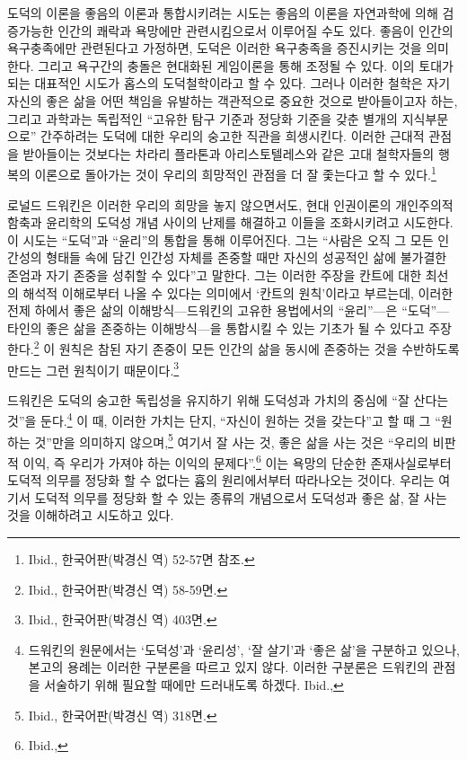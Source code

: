 도덕의 이론을 좋음의 이론과 통합시키려는 시도는 좋음의 이론을 자연과학에 의해 검증가능한 인간의 쾌락과 욕망에만 관련시킴으로서 이루어질 수도 있다. 좋음이 인간의 욕구충족에만 관련된다고 가정하면, 도덕은 이러한 욕구충족을 증진시키는 것을 의미한다. 그리고 욕구간의 충돌은 현대화된 게임이론을 통해 조정될 수 있다. 이의 토대가 되는 대표적인 시도가 홉스의 도덕철학이라고 할 수 있다. 그러나 이러한 철학은 자기 자신의 좋은 삶을 어떤 책임을 유발하는 객관적으로 중요한 것으로 받아들이고자 하는, 그리고 과학과는 독립적인 ``고유한 탐구 기준과 정당화 기준을 갖춘 별개의 지식부문으로'' 간주하려는 도덕에 대한 우리의 숭고한 직관을 희생시킨다. 이러한 근대적 관점을 받아들이는 것보다는 차라리 플라톤과 아리스토텔레스와 같은 고대 철학자들의 행복의 이론으로 돌아가는 것이 우리의 희망적인 관점을 더 잘 좇는다고 할 수 있다.\footnote{Ibid., 한국어판(박경신 역) 52-57면 참조.}

로널드 드워킨은 이러한 우리의 희망을 놓지 않으면서도, 현대 인권이론의 개인주의적 함축과 윤리학의 도덕성 개념 사이의 난제를 해결하고 이들을 조화시키려고 시도한다. 이 시도는 ``도덕''과 ``윤리''의 통합을 통해 이루어진다. 그는 ``사람은 오직 그 모든 인간성의 형태들 속에 담긴 인간성 자체를 존중할 때만 자신의 성공적인 삶에 불가결한 존엄과 자기 존중을 성취할 수 있다''고 말한다. 그는 이러한 주장을 칸트에 대한 최선의 해석적 이해로부터 나올 수 있다는 의미에서 `칸트의 원칙'이라고 부르는데, 이러한 전제 하에서 좋은 삶의 이해방식---드워킨의 고유한 용법에서의 ``윤리''---은 ``도덕''---타인의 좋은 삶을 존중하는 이해방식---을 통합시킬 수 있는 기초가 될 수 있다고 주장한다.\footnote{Ibid., 한국어판(박경신 역) 58-59면.} 이 원칙은 참된 자기 존중이 모든 인간의 삶을 동시에 존중하는 것을 수반하도록 만드는 그런 원칙이기 때문이다.\footnote{Ibid., 한국어판(박경신 역) 403면.}

드워킨은 도덕의 숭고한 독립성을 유지하기 위해 도덕성과 가치의 중심에 ``잘 산다는 것''을 둔다.\footnote{드워킨의 원문에서는 `도덕성'과 `윤리성', `잘 살기'과 `좋은 삶'을 구분하고 있으나, 본고의 용례는 이러한 구분론을 따르고 있지 않다. 이러한 구분론은 드워킨의 관점을 서술하기 위해 필요할 때에만 드러내도록 하겠다. Ibid.,} 이 때, 이러한 가치는 단지, ``자신이 원하는 것을 갖는다''고 할 때 그 ``원하는 것''만을 의미하지 않으며,\footnote{Ibid., 한국어판(박경신 역) 318면.} 여기서 잘 사는 것, 좋은 삶을 사는 것은 ``우리의 비판적 이익, 즉 우리가 가져야 하는 이익의 문제다''.\footnote{Ibid.,} 이는 욕망의 단순한 존재사실로부터 도덕적 의무를 정당화 할 수 없다는 흄의 원리에서부터 따라나오는 것이다. 우리는 여기서 도덕적 의무를 정당화 할 수 있는 종류의 개념으로서 도덕성과 좋은 삶, 잘 사는 것을 이해하려고 시도하고 있다.

